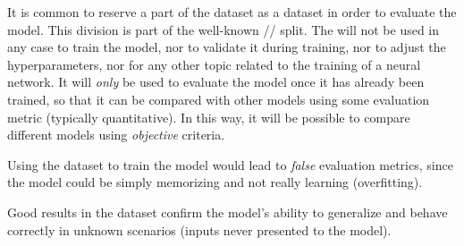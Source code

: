 It is common to reserve a part of the dataset as a  dataset in order
to evaluate the model. This division is part of the well-known
// split. The  will not be used in
any case to train the model, nor to validate it during training, nor to adjust
the hyperparameters, nor for any other topic related to
the training of a neural network. It will \emph{only} be used to evaluate the
model once it has already been trained, so that it can be compared with other
models using some evaluation metric (typically quantitative). In this way, it
will be possible to compare different models using \emph{objective} criteria.

\begin{remarkBox}
  Using the  dataset to train the model would lead to \emph{false}
  evaluation metrics, since the model could be simply memorizing and not really
  learning (overfitting).
\end{remarkBox}

Good results in the  dataset confirm the model's ability to
generalize and behave correctly in unknown scenarios (inputs never presented to
the model).
